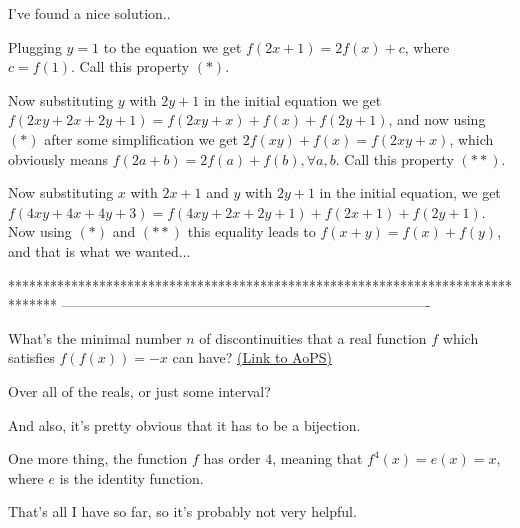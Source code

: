 \begin{mysolution}
	I've found a nice solution..

Plugging $ y = 1$ to the equation we get
$ f(2x + 1) = 2f(x) + c$, where $ c = f(1)$. Call this property $ (*)$.

Now substituting $ y$ with $ 2y + 1$ in the initial equation we get
$ f(2xy + 2x + 2y + 1) = f(2xy + x) + f(x) + f(2y + 1)$, and now using $ (*)$ after some simplification we get 
$ 2f(xy) + f(x) = f(2xy + x)$, which obviously means $ f(2a + b) = 2f(a) + f(b), \forall a,b$. Call this property $ (**)$.

Now substituting $ x$ with $ 2x + 1$ and $ y$ with $ 2y + 1$ in the initial equation, we get 
$ f(4xy + 4x + 4y + 3) = f(4xy + 2x + 2y + 1) + f(2x + 1) + f(2y + 1)$. Now using $ (*)$ and $ (**)$ this equality leads to $ f(x + y) = f(x) + f(y)$, and that is what we wanted...
\end{mysolution}
*******************************************************************************
-------------------------------------------------------------------------------

\begin{problem}
	What's the minimal number $n$ of discontinuities that a real function $f$ which satisfies $f(f(x)) =-x$ can have? 
	\flushright \href{https://artofproblemsolving.com/community/c7h113408}{(Link to AoPS)}
\end{problem}



\begin{mysolution}
	Over all of the reals, or just some interval?

And also, it's pretty obvious that it has to be a bijection.

One more thing, the function $f$ has order $4$, meaning that $f^{4}(x) = e(x) = x$, where $e$ is the identity function.

That's all I have so far, so it's probably not very helpful.
\end{mysolution}



